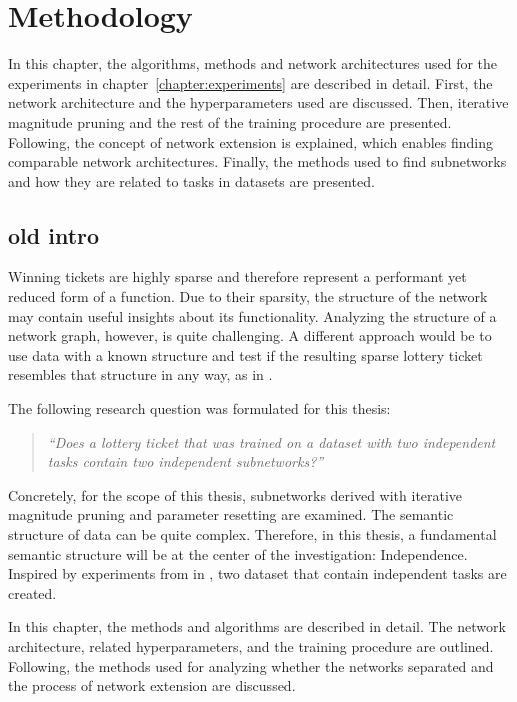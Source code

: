 \chapter{Methodology}\label{chapter:method} 

In this chapter, the algorithms, methods and network architectures used for the experiments in chapter~\ref{chapter:experiments} are described in detail.
First, the network architecture and the hyperparameters used are discussed.
Then, iterative magnitude pruning and the rest of the training procedure are presented.
Following, the concept of network extension is explained, which enables finding comparable network architectures.
Finally, the methods used to find subnetworks and how they are related to tasks in datasets are presented. 

\section{old intro}
Winning tickets are highly sparse and therefore represent a performant yet reduced form of a function.
Due to their sparsity, the structure of the network may contain useful insights about its functionality.
Analyzing the structure of a network graph, however, is quite challenging.
A different approach would be to use data with a known structure and test if the resulting sparse lottery ticket resembles that structure in any way, as in \autocite{BIMT}.

The following research question was formulated for this thesis:

\begin{quote}
\textit{``Does a lottery ticket that was trained on a dataset with two independent tasks contain two independent subnetworks?''}
\end{quote}

Concretely, for the scope of this thesis, subnetworks derived with iterative magnitude pruning and parameter resetting are examined.
The semantic structure of data can be quite complex.
Therefore, in this thesis, a fundamental semantic structure will be at the center of the investigation: Independence.
Inspired by experiments from in \textcite{BIMT}, two dataset that contain independent tasks are created.

In this chapter, the methods and algorithms are described in detail.
The network architecture, related hyperparameters, and the training procedure are outlined.
Following, the methods used for analyzing whether the networks separated and the process of network extension are discussed.


